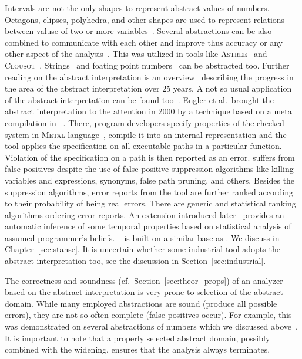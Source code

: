 Intervals are not the only shapes to represent abstract values of numbers.
Octagons, elipses, polyhedra, and other shapes are used to represent relations
between valuse of two or more variables~\cite{ai_octagons, ai_polyhedra,
astree}. Several abstractions can be also combined to communicate with each
other and improve thus accuracy or any other aspect of the
analysis~\cite{ai_product}. This was utilized in tools like
\textsc{Astree}~\cite{astree} and \textsc{Clousot}~\cite{clousot}.
Strings~\cite{ai_strings1, ai_strings2} and foating point
numbers~\cite{ai_float1} can be abstracted too.  Further reading on the
abstract interpretation is an overview~\cite{cousot_progress} describing the
progress in the area of the abstract interpretation over 25 years. A not so
usual application of the abstract interpretation can be found
too~\cite{ai_unusual1, ai_unusual2, ai_unusual3}.  Engler et al.\ brought the
abstract interpretation to the attention in 2000 by a technique based on a
meta compilation in \xgcc~\cite{metacomp}. There, program developers specify
properties of the checked system in \textsc{Metal} language~\cite{metal},
compile it into an internal representation and the tool applies the
specification on all executable paths in a particular function.  Violation of
the specification on a path is then reported as an error.  \xgcc suffers from
false positives despite the use of false positive suppression algorithms like
killing variables and expressions, synonyms, false path pruning, and others.
Besides the suppression algorithms, error reports from the tool are further
ranked according to their probability of being real errors. There are generic
and statistical ranking algorithms ordering error reports.  An extension
introduced later~\cite{lockchecker} provides an automatic inference of some
temporal properties based on statistical analysis of assumed programmer's
beliefs.  \stan~\cite{stanse} is built on a similar base as \xgcc. We discuss
\stan in Chapter~\ref{sec:stanse}.  It is uncertain whether some industrial
tool adopts the abstract interpretation too, see the discussion in
Section~\ref{sec:industrial}.

The correctness and soundness (cf.\ Section~\ref{sec:theor_props}) of an
analyzer based on the abstract interpretation is very prone to selection of
the abstract domain. While many employed abstractions are sound (produce all
possible errors), they are not so often complete (false positives occur). For
example, this was demonstrated on several abstractions of numbers which we
discussed above~\cite{ai_octagons}. It is important to note that a properly
selected abstract domain, possibly combined with the widening, ensures that
the analysis always terminates.




